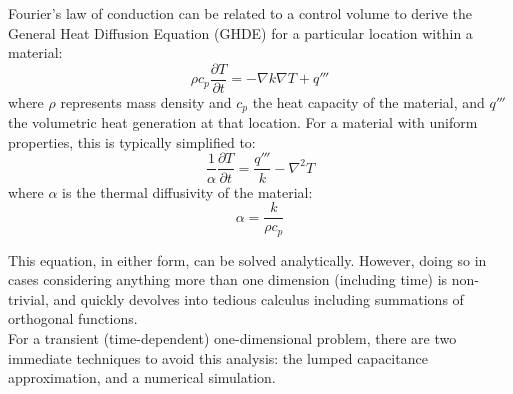 \documentclass[12pt]{article}
\begin{document}
Fourier's law of conduction can be related to a control volume to derive the General Heat Diffusion Equation (GHDE) for a particular location within a material\cite{bergman_fundamentals_2017}:
\begin{equation}
    \rho c_p\frac{\partial T}{\partial t} = -\nabla k \nabla T + q''' 
\end{equation}
where $\rho$ represents mass density and $c_p$ the heat capacity of the material, and $q'''$ the volumetric heat generation at that location.
For a material with uniform properties, this is typically simplified to:
\begin{equation}\label{eq:ghde-alpha}
    \frac{1}{\alpha}\frac{\partial T}{\partial t} = \frac{q'''}{k} - \nabla^2T
\end{equation}
where $\alpha$ is the thermal diffusivity of the material: \\
\begin{equation}
    \alpha = \frac{k}{\rho c_p}
\end{equation}

This equation, in either form, can be solved analytically.
However, doing so in cases considering anything more than one dimension (including time) is non-trivial, and quickly devolves into tedious calculus including summations of orthogonal functions.\cite{bergman_fundamentals_2017}\\

For a transient (time-dependent) one-dimensional problem, there are two immediate techniques to avoid this analysis: the lumped capacitance approximation, and a numerical simulation.
\end{document}
